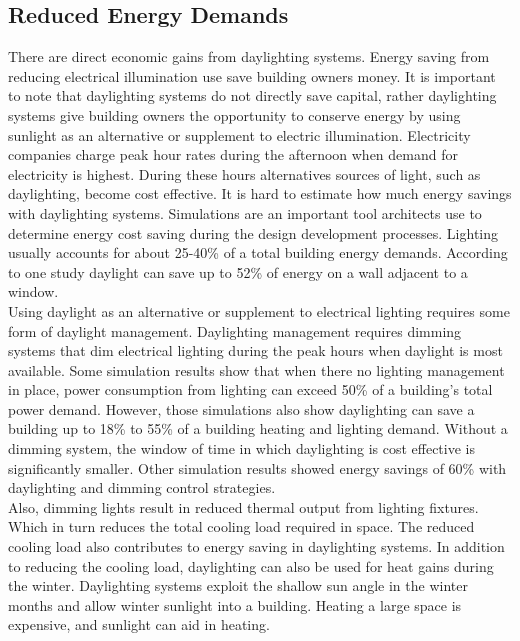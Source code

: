   \subsection{Reduced Energy Demands}
    There are direct economic gains from daylighting systems. Energy saving from reducing electrical illumination use save building owners money.
    It is important to note that daylighting systems do not directly save capital, rather daylighting systems give building owners the opportunity to conserve energy by using sunlight as an alternative or supplement to electric illumination. Electricity companies charge peak hour rates during the afternoon when demand for electricity is highest. During these hours alternatives sources of light, such as daylighting, become cost effective.
    It is hard to estimate how much energy savings with daylighting systems. Simulations are an important tool architects use to determine energy cost saving during the design development processes.  Lighting usually accounts for about 25-40\% of a total building energy demands.
    According to one study daylight can save up to 52\% of energy on a wall adjacent to a window\cite{Leslie}.\\

    Using daylight as an alternative or supplement to electrical lighting requires some form of daylight management. Daylighting management requires dimming systems that dim electrical lighting during the peak hours when daylight is most available.  Some simulation results show that when there no lighting management in place,  power consumption from lighting can exceed 50\% of a building's total power demand.
    However, those simulations also show daylighting can save a building up to 18\% to 55\% of a building heating and lighting demand\cite{Bodart}.
    Without a dimming system, the window of time in which daylighting is cost effective is significantly smaller. Other simulation results showed energy savings of 60\% with daylighting and dimming control strategies\cite{Ihm}. \\

    Also, dimming lights result in reduced thermal output from lighting fixtures. Which in turn reduces the total cooling load required in space. The reduced cooling load also contributes to energy saving in daylighting systems\cite{Leslie}. In addition to reducing the cooling load, daylighting can also be used for heat gains during the winter. Daylighting systems exploit the shallow sun angle in the winter months and allow winter sunlight into a building. Heating a large space is expensive, and sunlight can aid in heating\cite{Bodart}. \\

